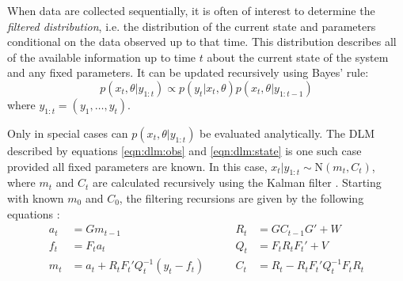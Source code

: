 When data are collected sequentially, it is often of interest to determine the \emph{filtered distribution}, i.e. the distribution of the current state and parameters conditional on the data observed up to that time. This distribution describes all of the available information up to time $t$ about the current state of the system and any fixed parameters. It can be updated recursively using Bayes' rule:
\begin{equation}
p(x_t,\theta| y_{1:t}) \propto p(y_t|x_t,\theta)p(x_t,\theta|y_{1:t-1}) \label{eqn:filtered}
\end{equation}
where $y_{1:t} = (y_1,\ldots,y_t)$.

Only in special cases can $p(x_t,\theta| y_{1:t})$ be evaluated analytically. The DLM described by equations \eqref{eqn:dlm:obs} and \eqref{eqn:dlm:state} is one such case provided all fixed parameters are known. In this case, $x_t|y_{1:t} \sim \mbox{N}(m_t,C_t)$, where $m_t$ and $C_t$ are calculated recursively using the Kalman filter \citep{kal:1960:ekf}. Starting with known $m_0$ and $C_0$, the filtering recursions are given by the following equations \cite[Sec 2.7.2][]{petris:camp:2009:dynamic}:
\begin{align}
a_t &= Gm_{t-1} &\qquad R_t &= GC_{t-1}G' + W \label{eqn:dlm:kal} \\
f_t &= F_ta_t &\qquad Q_t &= F_tR_tF_t' + V \nonumber \\
m_t &= a_t + R_tF_t'Q_t^{-1}(y_t-f_t) &\qquad C_t &= R_t - R_tF_t'Q_t^{-1}F_tR_t \nonumber
\end{align}

